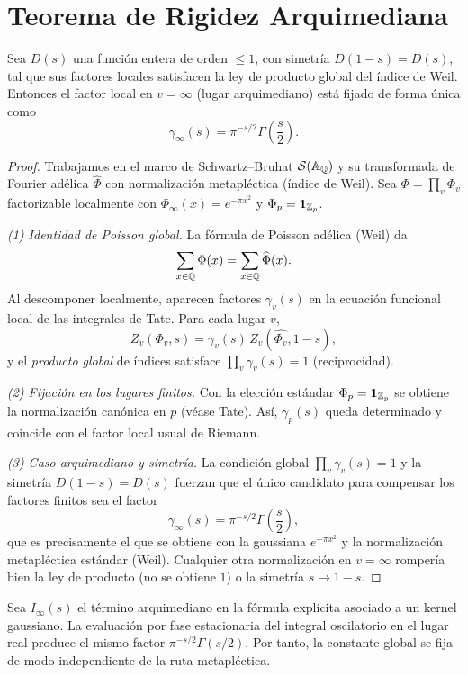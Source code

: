 \section{Teorema de Rigidez Arquimediana}

\begin{theorem}
Sea $D(s)$ una función entera de orden $\le 1$, con simetría $D(1-s)=D(s)$, tal que
sus factores locales satisfacen la ley de producto global del índice de Weil. Entonces
el factor local en $v=\infty$ (lugar arquimediano) está fijado de forma única como
\[
\gamma_\infty(s)=\pi^{-s/2}\Gamma\!\left(\frac{s}{2}\right).
\]
\end{theorem}

\begin{proof}
Trabajamos en el marco de Schwartz--Bruhat $\mathcal{S}(\Bbb A_\Bbb Q)$ y su transformada de Fourier adélica $\widehat{\Phi}$ con normalización metapléctica (índice de Weil).
Sea $\Phi=\prod_v \Phi_v$ factorizable localmente con $\Phi_\infty(x)=e^{-\pi x^2}$ y $\Phi_p=\mathbf 1_{\Bbb Z_p}$.

\emph{(1) Identidad de Poisson global.} La fórmula de Poisson adélica (Weil) da
\[
\sum_{x\in\Bbb Q}\Phi(x)=\sum_{x\in\Bbb Q}\widehat\Phi(x).
\]
Al descomponer localmente, aparecen factores $\gamma_v(s)$ en la ecuación funcional local de las integrales de Tate. Para cada lugar $v$,
\[
Z_v(\Phi_v,s)=\gamma_v(s)\,Z_v(\widehat{\Phi_v},1-s),
\]
y el \emph{producto global} de índices satisface $\prod_v \gamma_v(s)=1$ (reciprocidad).

\emph{(2) Fijación en los lugares finitos.} Con la elección estándar $\Phi_p=\mathbf 1_{\Bbb Z_p}$ se obtiene la normalización canónica en $p$ (véase Tate). Así, $\gamma_p(s)$ queda determinado y coincide con el factor local usual de Riemann.

\emph{(3) Caso arquimediano y simetría.} La condición global $\prod_v \gamma_v(s)=1$ y la simetría $D(1-s)=D(s)$ fuerzan que el único candidato para compensar los factores finitos sea el factor
\[
\gamma_\infty(s)=\pi^{-s/2}\Gamma\!\left(\frac{s}{2}\right),
\]
que es precisamente el que se obtiene con la gaussiana $e^{-\pi x^2}$ y la normalización metapléctica estándar (Weil). Cualquier otra normalización en $v=\infty$ rompería bien la ley de producto (no se obtiene $1$) o la simetría $s\mapsto 1-s$.
\end{proof}

\begin{prop}
Sea $I_\infty(s)$ el término arquimediano en la fórmula explícita asociado a un kernel gaussiano.
La evaluación por fase estacionaria del integral oscilatorio en el lugar real produce
el mismo factor $\pi^{-s/2}\Gamma(s/2)$. Por tanto, la constante global se fija de modo independiente de la ruta metapléctica.
\end{prop}

